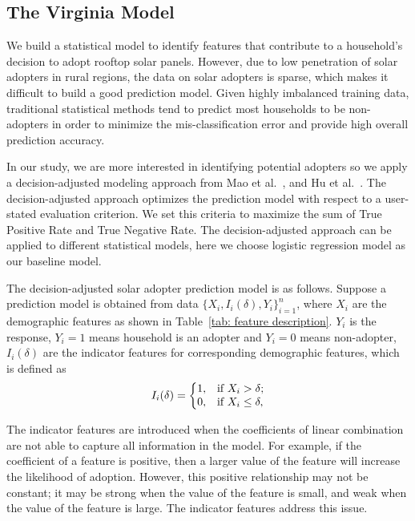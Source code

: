 \subsection{The Virginia Model} \label{virginia_model}

We build a statistical model to identify features that contribute to a household's decision to adopt rooftop solar panels.
However, due to low penetration of solar adopters in rural regions, the data on
solar adopters is sparse, which makes it difficult to build a good
prediction model. Given highly imbalanced training data, traditional statistical methods
tend to predict most households to be non-adopters in order to minimize
the mis-classification error and provide high overall prediction
accuracy.

In our study, we are more interested in identifying potential adopters
so we apply a decision-adjusted modeling approach 
from Mao et al.~\cite{Mao}, and Hu et al.~\cite{hu19rooftop}. The decision-adjusted
approach optimizes the prediction model with respect to a user-stated
evaluation criterion. We set this criteria to maximize the sum of True
Positive Rate and True Negative Rate. The decision-adjusted approach can be applied to
different statistical models, here we choose logistic regression model as
our baseline model.

The decision-adjusted solar adopter prediction model is as
follows. Suppose a prediction model is obtained from data
$\{X_i,I_i(\delta),Y_i\}_{i=1}^n$, where $X_i$ are the demographic features as
shown in Table~\ref{tab: feature description}.  $Y_i$ is the response,
$Y_i = 1$ means household is an adopter and $Y_i = 0$ means non-adopter, $I_i(\delta)$ are the indicator features for corresponding demographic features, which is defined as
\begin{equation*}
I_i(\delta)=\left\{
\begin{array}{@{}ll@{}}
1, & \text{if }X_i > \delta;\\
0, & \text{if }X_i \leq \delta,
\end{array}\right.
\end{equation*}

The indicator features are introduced when the coefficients of linear combination are not able to
capture all information in the model. For example, if the coefficient of a feature
is positive, then a larger value of the feature will increase the
likelihood of adoption. However, this positive relationship may not be
constant; it may be strong when the value of the
feature is small, and weak when the value of the feature is
large. The indicator features address this issue.

